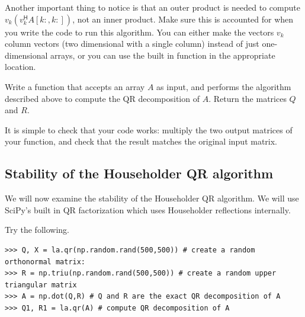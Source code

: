 
Another important thing to notice is that an outer product is needed to compute $v_k \left( v_k^\mathsf{H} A[k:,k:] \right)$, not an inner product.
Make sure this is accounted for when you write the code to run this algorithm. You can either make the vectors $v_k$ column vectors (two dimensional with a single column) instead of just one-dimensional arrays, or you can use the built in function  in the appropriate location.

\begin{problem}
\label{prob:HouseholderQR}
Write a function  that accepts an array $A$ as input, and performs
the algorithm described above to compute the QR decomposition of $A$. Return the
matrices $Q$ and $R$.

It is simple to check that your code works: multiply the two output matrices
of your function, and check that the result matches the original input matrix.
\end{problem}

\subsection*{Stability of the Householder QR algorithm}
We will now examine the stability of the Householder QR algorithm.
We will use SciPy's built in QR factorization which uses Householder reflections internally.

Try the following.

\begin{lstlisting}
>>> Q, X = la.qr(np.random.rand(500,500)) # create a random orthonormal matrix:
>>> R = np.triu(np.random.rand(500,500)) # create a random upper triangular matrix
>>> A = np.dot(Q,R) # Q and R are the exact QR decomposition of A
>>> Q1, R1 = la.qr(A) # compute QR decomposition of A
\end{lstlisting}

